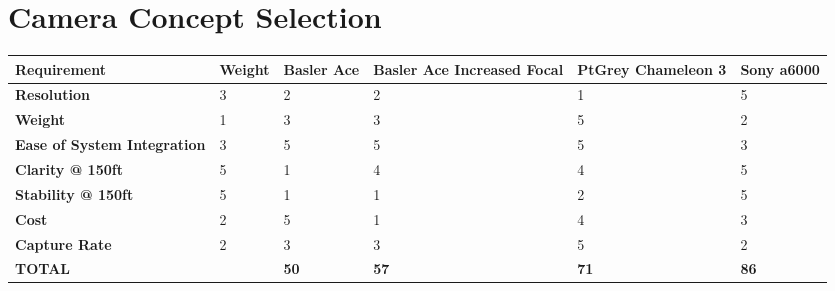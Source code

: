 \documentclass[]{auvsi_doc}
\begin{document}
\begin{AUVSITitlePage}
\begin{artifacttable}
\end{artifacttable}
\end{AUVSITitlePage}

\section{Camera Concept Selection}
\begin{table}[H]
\centering
\begin{tabular}{|p{3.45cm}|p{1.5cm}|p{1.55cm}|p{2.5cm}|p{2.5cm}|p{2.0cm}|}
\hline
\rowcolor[HTML]{C0C0C0}
{\color[HTML]{000000} \textbf{Requirement}} & {\color[HTML]{000000} \textbf{Weight}} & {\color[HTML]{000000} \textbf{Basler Ace}} & {\color[HTML]{000000} \textbf{Basler Ace Increased Focal}} & {\color[HTML]{000000} \textbf{PtGrey Chameleon 3}} & {\color[HTML]{000000} \textbf{Sony a6000}}\\ \hline
{\color[HTML]{000000} \textbf{Resolution}}	& 3	& 2	& 2	& 1	& 5 \\ \hline
{\color[HTML]{000000} \textbf{Weight}}	&	1	&	3 &	3 	& 	5 	&	2 \\ \hline 
{\color[HTML]{000000} \textbf{Ease of System Integration}}	&	3 	&	5 	& 	5 	& 	5 	& 	3 \\ \hline
{\color[HTML]{000000} \textbf{Clarity @ 150ft}}	&	5 	&	1 	& 	4	&	4	&	5 \\ \hline
{\color[HTML]{000000} \textbf{Stability @ 150ft}}	&	5 	&	1 	&	1 	&	2	&	5 \\ \hline
{\color[HTML]{000000} \textbf{Cost}}	&	2 	&	5 	&	1 	&	4	&	3 \\ \hline
{\color[HTML]{000000} \textbf{Capture Rate}}	&	2 	&	3 	&	3 	&	5 	&	2 \\ \hline
\rowcolor[HTML]{C0C0C0}
{\color[HTML]{000000} \textbf{TOTAL}}	&	&	{\color[HTML]{000000} \textbf{50}}	&	{\color[HTML]{000000} \textbf{57}}	&	{\color[HTML]{000000} \textbf{71}}	&	{\color[HTML]{000000} \textbf{86}} \\ \hline
\end{tabular}
\end{table}
\end{document}
